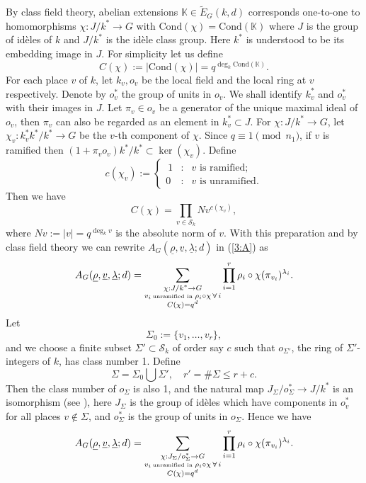\documentclass[12pt]{amsart}
\theoremstyle{plain}
\begin{document}
By class field theory, abelian extensions ${{\mathbb K}} \in \widetilde{E}_G(k,d)$ corresponds one-to-one to homomorphisms $\chi: J/k^* \to G$ with $\mathrm{Cond}(\chi)=\mathrm{Cond}({{\mathbb K}})$ where $J$ is the group of id\`{e}les of $k$ and $J/k^*$ is the id\`{e}le class group. Here $k^*$ is understood to be its embedding image in $J$. For simplicity let us define
\[C(\chi):=| \mathrm{Cond}(\chi) |=q^{\deg_k \mathrm{Cond}({{\mathbb K}})}. \]
For each place $v$ of $k$, let $k_v,o_v$ be the local field and the local ring at $v$ respectively. Denote by $o_v^*$ the group of units in $o_v$. We shall identify $k_v^*$ and $o_v^*$ with their images in $J$. Let $\pi_v \in o_v$ be a generator of the unique maximal ideal of $o_v$, then $\pi_v$ can also be regarded as an element in $k_v^* \subset J$. For $\chi: J/k^* \to G$, let $\chi_v:k_v^*k^*/k^* \to G$ be the $v$-th component of $\chi$. Since $q \equiv 1 \pmod{n_1}$, if $v$ is ramified then $(1+\pi_v o_v)k^*/k^* \subset \ker (\chi_v)$. Define
\[c(\chi_v):=\left\{\begin{array}{ccl}\
1&:& v \mbox{ is ramified}; \\
0&:& v \mbox{ is unramified}.
\end{array}\right.\]
Then we have
\[C(\chi)=\prod_{v \in {\mathcal{S}_k}}N v^{c(\chi_v)}, \]
where $Nv:=|v|=q^{\deg_k v}$ is the absolute norm of $v$. With this preparation and by class field theory we can rewrite ${A_{G}({\underline{{\rho}}},{\underline{{v}}},{\underline{{\lambda}}};d)}$ in (\ref{3:A}) as \[{A_{G}({\underline{{\rho}}},{\underline{{v}}},{\underline{{\lambda}}};d)}=\sum_{\substack{\chi:J/k^* \to G \\
v_i \, \mbox{\tiny unramified in } \rho_i \circ \chi \, \forall \, i\\
C(\chi)=q^d
}} \prod_{i=1}^r \rho_i \circ \chi (\pi_{v_i})^{\lambda_i}. \]
Let
\[ \Sigma_0:=\{v_1,\ldots,v_r\},\]
and we choose a finite subset $\Sigma' \subset {\mathcal{S}_k}$ of order say $c$ such that $o_{\Sigma'}$, the ring of $\Sigma'$-integers of $k$, has class number 1. Define
\[\Sigma=\Sigma_0 \bigcup \Sigma', \quad r'=\#\Sigma \le r+c. \]
Then the class number of $o_{\Sigma}$ is also 1, and the natural map $J_{\Sigma}/o_{\Sigma}^* \to J/k^*$ is an isomorphism (see \cite[Lemma 2.8]{woo}), here $J_{\Sigma}$ is the group of id\`{e}les which have components in $o_v^*$ for all places $v \notin \Sigma$, and $o_{\Sigma}^*$ is the group of units in $o_{\Sigma}$. Hence we have
\begin{eqnarray*}
{A_{G}({\underline{{\rho}}},{\underline{{v}}},{\underline{{\lambda}}};d)}=\sum_{\substack{\chi:J_{\Sigma}/o_{\Sigma}^* \to G \\
v_i \, \mbox{\tiny unramified in } \rho_i \circ \chi \, \forall \, i\\
C(\chi)=q^d}} \prod_{i=1}^r \rho_i \circ \chi (\pi_{v_i})^{\lambda_i}.
\end{eqnarray*}
\end{document}
